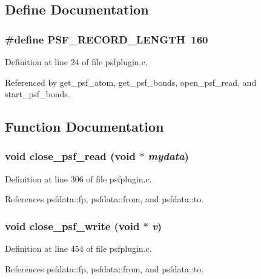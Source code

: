\subsection{Define Documentation}
\subsubsection{\setlength{\rightskip}{0pt plus 5cm}\#define PSF\_\-RECORD\_\-LENGTH\ 160}\label{psfplugin_8c_a0}




Definition at line 24 of file psfplugin.c.

Referenced by get\_\-psf\_\-atom, get\_\-psf\_\-bonds, open\_\-psf\_\-read, and start\_\-psf\_\-bonds.

\subsection{Function Documentation}
\subsubsection{\setlength{\rightskip}{0pt plus 5cm}void close\_\-psf\_\-read (void $\ast$ {\em mydata})\hspace{0.3cm}{\tt  [static]}}\label{psfplugin_8c_a8}




Definition at line 306 of file psfplugin.c.

References psfdata::fp, psfdata::from, and psfdata::to.
\subsubsection{\setlength{\rightskip}{0pt plus 5cm}void close\_\-psf\_\-write (void $\ast$ {\em v})\hspace{0.3cm}{\tt  [static]}}\label{psfplugin_8c_a12}




Definition at line 454 of file psfplugin.c.

References psfdata::fp, psfdata::from, and psfdata::to.
